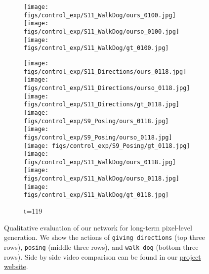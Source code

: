 \documentclass{article}
\begin{document}
\begin{appendix}
\begin{figure*}[!thbp]
\begin{subfigure}{0.12\linewidth}
  		\texttt{[image: figs/control\_exp/S11\_WalkDog/ours\_0100.jpg]}
  		\texttt{[image: figs/control\_exp/S11\_WalkDog/ourso\_0100.jpg]}
  		\vspace{.2cm}
  		\texttt{[image: figs/control\_exp/S11\_WalkDog/gt\_0100.jpg]}
	\end{subfigure}
	\begin{subfigure}{0.12\linewidth}
        \caption*{t=119}
        \vspace{-7pt}
	    \texttt{[image: figs/control\_exp/S11\_Directions/ours\_0118.jpg]}
	    \texttt{[image: figs/control\_exp/S11\_Directions/ourso\_0118.jpg]}
	    \vspace{.2cm}
  		\texttt{[image: figs/control\_exp/S11\_Directions/gt\_0118.jpg]}
  		\texttt{[image: figs/control\_exp/S9\_Posing/ours\_0118.jpg]}
  		\texttt{[image: figs/control\_exp/S9\_Posing/ourso\_0118.jpg]}
  		\vspace{.2cm}
  		\texttt{[image: figs/control\_exp/S9\_Posing/gt\_0118.jpg]}
  		\texttt{[image: figs/control\_exp/S11\_WalkDog/ours\_0118.jpg]}
  		\texttt{[image: figs/control\_exp/S11\_WalkDog/ourso\_0118.jpg]}
  		\vspace{.2cm}
  		\texttt{[image: figs/control\_exp/S11\_WalkDog/gt\_0118.jpg]}
	\end{subfigure}
    \vspace{-10pt}
    \caption{Qualitative evaluation of our network for long-term pixel-level generation. We show the actions of \texttt{giving directions} (top three rows), \texttt{posing} (middle three rows), and \texttt{walk dog} (bottom three rows). Side by side video comparison can be found in our \href{https://goo.gl/U7UOfy}{project website}.}
\label{fig:h36mgtft}
\vspace{-40pt}
\end{figure*}


\end{appendix}
\end{document}
